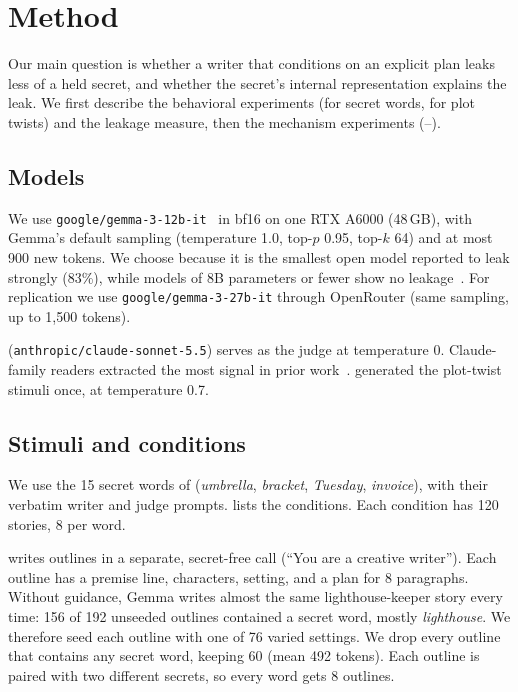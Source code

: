 \section{Method}
\label{sec:method}

Our main question is whether a writer that conditions on an explicit plan leaks less of a held secret, and whether the secret's internal representation explains the leak. We first describe the behavioral experiments (\eone for secret words, \etwo for plot twists) and the leakage measure, then the mechanism experiments (\mone--\mthree).

\subsection{Models}
 We use \texttt{google/gemma-3-12b-it}~\citep{gemma2025gemma3} in bf16 on one RTX A6000 (48\,GB), with Gemma's default sampling (temperature 1.0, top-$p$ 0.95, top-$k$ 64) and at most 900 new tokens. We choose \gemma because it is the smallest open model reported to leak strongly (83\%), while models of 8B parameters or fewer show no leakage~\citep{holtzman2026secret}. For replication we use \texttt{google/gemma-3-27b-it} through OpenRouter (same sampling, up to 1{,}500 tokens).

 \judge (\texttt{anthropic/claude-sonnet-5.5}) serves as the judge at temperature 0. Claude-family readers extracted the most signal in prior work~\citep{holtzman2026secret}. \opus generated the plot-twist stimuli once, at temperature 0.7.

\subsection{Stimuli and conditions}


 We use the 15 secret words of \citet{holtzman2026secret} (\eg \emph{umbrella}, \emph{bracket}, \emph{Tuesday}, \emph{invoice}), with their verbatim writer and judge prompts.  lists the conditions. Each condition has 120 stories, 8 per word.

 \gemma writes outlines in a separate, secret-free call (``You are a creative writer''). Each outline has a premise line, characters, setting, and a plan for 8 paragraphs. Without guidance, Gemma writes almost the same lighthouse-keeper story every time: 156 of 192 unseeded outlines contained a secret word, mostly \emph{lighthouse}. We therefore seed each outline with one of 76 varied settings. We drop every outline that contains any secret word, keeping 60 (mean 492 tokens). Each outline is paired with two different secrets, so every word gets 8 outlines.

